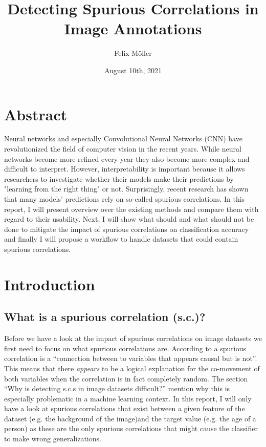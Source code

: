 \documentclass{article}
\title{Detecting Spurious Correlations in Image Annotations}
\author{Felix Möller}
\date{August 10th, 2021}
\begin{document}
\maketitle
\tableofcontents
\newpage
\section{Abstract}
Neural networks and especially Convolutional Neural Networks (CNN) have revolutionized the field of computer vision in the recent years. While neural networks become more refined every year they also become more complex and difficult to interpret. However, interpretability is important because it allows researchers to investigate whether their models make their predictions by "learning from the right thing" or not. Surprisingly, recent research has shown that many models' predictions rely on so-called spurious correlations. In this report, I will present overview over the existing methods and compare them with regard to their usability. Next, I will show what should and what should not be done to mitigate the impact of spurious correlations on classification accuracy and finally I will propose a workflow to handle datasets that could contain spurious correlations. 
\section{Introduction}
\subsection{What is a spurious correlation (s.c.)?}
Before we have a look at the impact of spurious correlations on image datasets we first need to focus on what spurious correlations are. According to \cite{sc_def} a spurious correlation is a \enquote{connection between to variables that appears causal but is not}. This means that there \textit{appears} to be a logical explanation for the co-movement of both variables when the correlation is in fact completely random. The section \enquote{Why is detecting s.c.s in image datasets difficult?} mention why this is especially problematic in a machine learning context.
In this report, I will only have a look at spurious correlations that exist between a given feature of the dataset (e.g. the background of the image)and the target value (e.g. the age of a person) as these are the only spurious correlations that might cause the classifier to make wrong generalizations.
\end{document}
